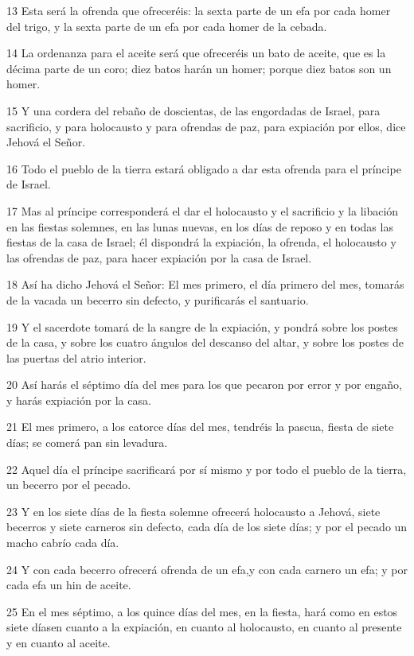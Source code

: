 \par 13 Esta será la ofrenda que ofreceréis: la sexta parte de un efa por cada homer del trigo, y la sexta parte de un efa por cada homer de la cebada.
\par 14 La ordenanza para el aceite será que ofreceréis un bato de aceite, que es la décima parte de un coro; diez batos harán un homer; porque diez batos son un homer.
\par 15 Y una cordera del rebaño de doscientas, de las engordadas de Israel, para sacrificio, y para holocausto y para ofrendas de paz, para expiación por ellos, dice Jehová el Señor.
\par 16 Todo el pueblo de la tierra estará obligado a dar esta ofrenda para el príncipe de Israel.
\par 17 Mas al príncipe corresponderá el dar el holocausto y el sacrificio y la libación en las fiestas solemnes, en las lunas nuevas, en los días de reposo y en todas las fiestas de la casa de Israel; él dispondrá la expiación, la ofrenda, el holocausto y las ofrendas de paz, para hacer expiación por la casa de Israel.
\par 18 Así ha dicho Jehová el Señor: El mes primero, el día primero del mes, tomarás de la vacada un becerro sin defecto, y purificarás el santuario.
\par 19 Y el sacerdote tomará de la sangre de la expiación, y pondrá sobre los postes de la casa, y sobre los cuatro ángulos del descanso del altar, y sobre los postes de las puertas del atrio interior.
\par 20 Así harás el séptimo día del mes para los que pecaron por error y por engaño, y harás expiación por la casa.
\par 21 El mes primero, a los catorce días del mes, tendréis la pascua, fiesta de siete días; se comerá pan sin levadura. 
\par 22 Aquel día el príncipe sacrificará por sí mismo y por todo el pueblo de la tierra, un becerro por el pecado.
\par 23 Y en los siete días de la fiesta solemne ofrecerá holocausto a Jehová, siete becerros y siete carneros sin defecto, cada día de los siete días; y por el pecado un macho cabrío cada día.
\par 24 Y con cada becerro ofrecerá ofrenda de un efa,y con cada carnero un efa; y por cada efa un hin de aceite.
\par 25 En el mes séptimo, a los quince días del mes, en la fiesta, hará como en estos siete díasen cuanto a la expiación, en cuanto al holocausto, en cuanto al presente y en cuanto al aceite.

